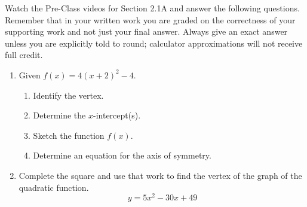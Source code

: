 


\noindent Watch the Pre-Class videos for Section 2.1A and answer the following questions. Remember that in your written work you are graded on the correctness of your supporting work and not just your final answer. Always give an exact answer unless you are explicitly told to round; calculator approximations will not receive full credit. 


\begin{enumerate}

\item Given $f(x)=4(x+2)^2-4$.
\begin{enumerate}

\item Identify the vertex.
\vfill
\item Determine the $x$-intercept(s).
\vfill
\vfill
\item Sketch the function $f(x)$.\\





\item Determine an equation for the axis of symmetry.
\end{enumerate}



\vfill
\newpage

\item  Complete the square and use that work to find the vertex of the graph of the quadratic function.
$$y=5x^2-30x+49$$


\end{enumerate}
